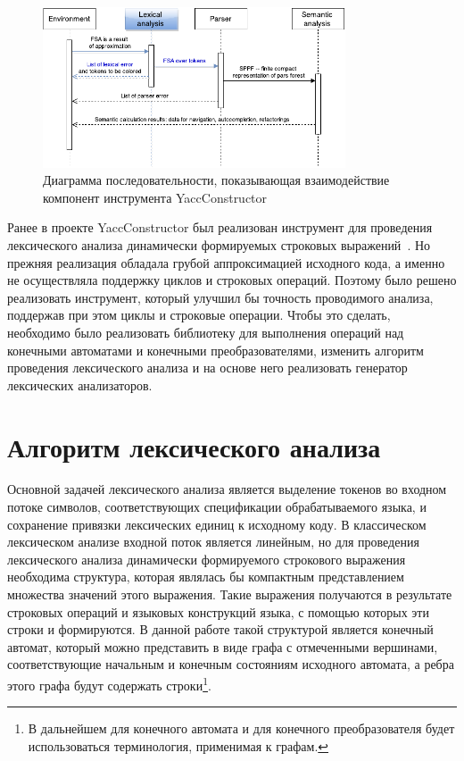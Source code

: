 \begin{figure}[H]
\begin{center}
\includegraphics[width=0.8\textwidth]{Polubelova/Seq_with_lexer_highlighted}
\caption{Диаграмма последовательности, показывающая взаимодействие компонент инструмента YaccConstructor}
\label{fig:seqYC} 
\end{center}
\end{figure}

Ранее в проекте YaccConstructor был реализован инструмент для проведения лексического анализа динамически формируемых строковых выражений~\cite{Verbitskaya, Polubelova}. Но прежняя реализация обладала грубой аппроксимацией исходного кода, а именно не осуществляла поддержку циклов и строковых операций. Поэтому было решено реализовать инструмент, который улучшил  бы точность проводимого анализа, поддержав при этом циклы и строковые операции. Чтобы это сделать, необходимо было реализовать библиотеку для выполнения операций над конечными автоматами и конечными преобразователями, изменить алгоритм проведения лексического анализа и на основе него реализовать генератор лексических анализаторов. 

\section{Алгоритм лексического анализа}

Основной задачей лексического анализа является выделение токенов во входном потоке символов, соответствующих спецификации обрабатываемого языка, и сохранение привязки лексических единиц к исходному коду. В классическом лексическом анализе входной поток является линейным, но для проведения лексического анализа динамически формируемого строкового выражения необходима структура, которая являлась бы компактным представлением множества значений этого выражения. Такие выражения получаются в результате строковых операций и языковых конструкций языка, с помощью которых эти строки и формируются. В данной работе такой структурой является конечный автомат, который можно представить в виде графа с отмеченными вершинами, соответствующие начальным и конечным состояниям исходного автомата, а ребра этого графа будут содержать строки\footnote{В дальнейшем для конечного автомата и для конечного преобразователя будет использоваться терминология, применимая к графам.}. 

